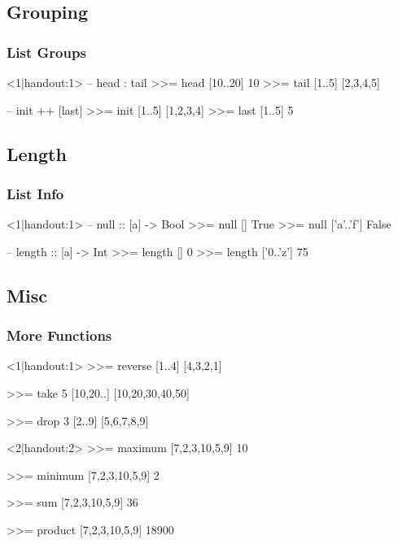 \subsection{Grouping}
\begin{frame}[t,fragile]
    \frametitle{List Groups}
    \begin{hscode}<1|handout:1>
        -- head : tail
        >>= head [10..20]
        10
        >>= tail [1..5]
        [2,3,4,5]

        -- init ++ [last]
        >>= init [1..5]
        [1,2,3,4]
        >>= last [1..5]
        5
    \end{hscode}
\end{frame}

\subsection{Length}
\begin{frame}[t,fragile]
    \frametitle{List Info}
    \begin{hscode}<1|handout:1>
        -- null :: [a] -> Bool
        >>= null []
        True
        >>= null ['a'..'f']
        False

        -- length :: [a] -> Int
        >>= length []
        0
        >>= length ['0..'z']
        75
    \end{hscode}
\end{frame}

\subsection{Misc}
\begin{frame}[t,fragile]
    \frametitle{More Functions}
    \begin{overprint}
        \begin{hscode}<1|handout:1>
            >>= reverse [1..4]
            [4,3,2,1]

            >>= take 5 [10,20..]
            [10,20,30,40,50]

            >>= drop 3 [2..9]
            [5,6,7,8,9]
        \end{hscode}

        \begin{hscode}<2|handout:2>
            >>= maximum [7,2,3,10,5,9]
            10

            >>= minimum [7,2,3,10,5,9]
            2

            >>= sum [7,2,3,10,5,9]
            36

            >>= product [7,2,3,10,5,9]
            18900
        \end{hscode}
    \end{overprint}
\end{frame}

